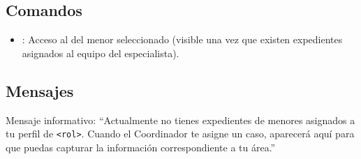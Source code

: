 \subsection{Comandos}
	\begin{itemize}
		\item {}: Acceso al  del menor seleccionado (visible una vez que existen expedientes asignados al equipo del especialista).
	\end{itemize}

\subsection{Mensajes}
	\begin{Citemize}
		\item Mensaje informativo: ``Actualmente no tienes expedientes de menores asignados a tu perfil de \texttt{<rol>}. Cuando el Coordinador te asigne un caso, aparecerá aquí para que puedas capturar la información correspondiente a tu área.''
	\end{Citemize}
